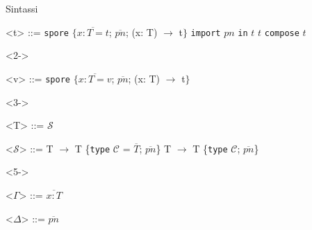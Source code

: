 \begin{frame}{Sintassi}
	\begin{grammar}
		<t> ::= \texttt{spore} $\{\overline{x: T = t}$; $\overline{pn}$; (x: T) $\rightarrow$ t$\}$
		\alt \texttt{import} $pn$ \texttt{in} $t$
		\alt $t$ \texttt{compose} $t$
	\end{grammar}	
	
	\begin{onlyenv}<2->
		\begin{grammar}
			<v> ::= \texttt{spore} $\{\overline{x: T = v}$; $\overline{pn}$; (x: T) $\rightarrow$ t$\}$
		\end{grammar}
	\end{onlyenv}
	
	\begin{onlyenv}<3->
		\begin{grammar}
			<T> ::= $\mathcal{S}$
			
			<$\mathcal{S}$> ::= T $\rightarrow$ T \{\texttt{type} $\mathcal{C}$ = $\overline{T}$; $\overline{pn}$\}
			\alt T $\rightarrow$ T \{\texttt{type} $\mathcal{C}$; $\overline{pn}$\}
		\end{grammar}
	\end{onlyenv}
	
	\only<4->{
		$P \in pn \rightarrow \mathcal{T}$ 
	}
	
	\begin{onlyenv}<5->
		\begin{grammar}
			<$\Gamma$> ::= $\overline{x: T}$
			
			<$\Delta$> ::= $\overline{pn}$
		\end{grammar}
	\end{onlyenv}
\end{frame}